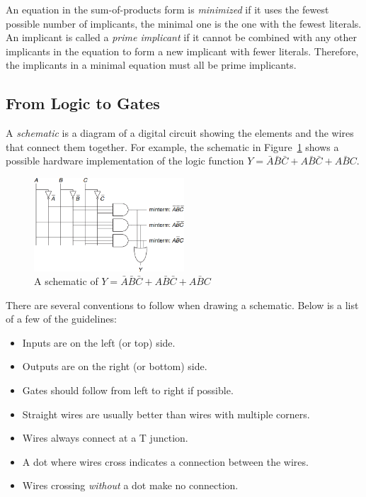 \documentclass[12pt]{article}
\begin{document}
\begin{enumerate}
  An equation in the sum-of-products form is \textit{minimized} if it uses the fewest possible number of implicants, the minimal one is the one with the fewest literals. An implicant is called a \textit{prime implicant} if it cannot be combined with any other implicants in the equation to form a new implicant with fewer literals. Therefore, the implicants in a minimal equation must all be prime implicants.
\end{enumerate}

\subsection{From Logic to Gates}

A \textit{schematic} is a diagram of a digital circuit showing the elements and the wires that connect them together. For example, the schematic in Figure~\ref{figure:2} shows a possible hardware implementation of the logic function $Y = \bar{A}\bar{B}\bar{C} + A\bar{B}\bar{C} + A\bar{B}C$.

\begin{figure}[h]
  \centering
  \includegraphics[width=0.5\textwidth]{schematic.png}
  \caption{A schematic of $Y = \bar{A}\bar{B}\bar{C} + A\bar{B}\bar{C} + A\bar{B}C$}
  \label{figure:2}
\end{figure}

There are several conventions to follow when drawing a schematic. Below is a list of a few of the guidelines:

\begin{itemize}
  \item Inputs are on the left (or top) side.
  \item Outputs are on the right (or bottom) side.
  \item Gates should follow from left to right if possible.
  \item Straight wires are usually better than wires with multiple corners.
  \item Wires always connect at a T junction.
  \item A dot where wires cross indicates a connection between the wires.
  \item Wires crossing \textit{without} a dot make no connection.
\end{itemize}
\end{document}
